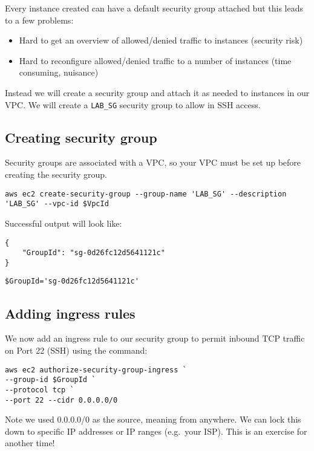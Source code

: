 Every instance created can have a default security group attached but
this leads to a few problems:

\begin{itemize}
\item
  Hard to get an overview of allowed/denied traffic to instances
  (security risk)
\item
  Hard to reconfigure allowed/denied traffic to a number of instances
  (time consuming, nuisance)
\end{itemize}

Instead we will create a security group and attach it as needed to
instances in our VPC. We will create a \texttt{LAB\_SG} security group
to allow in SSH access.

\subsection{Creating security group}\label{sec:creating-security-group}

Security groups are associated with a VPC, so your VPC must be set up
before creating the security group.

\begin{verbatim}
aws ec2 create-security-group --group-name 'LAB_SG' --description 'LAB_SG' --vpc-id $VpcId
\end{verbatim}

Successful output will look like:

\begin{verbatim}
{
    "GroupId": "sg-0d26fc12d5641121c"
}
\end{verbatim}

\begin{verbatim}
$GroupId='sg-0d26fc12d5641121c'
\end{verbatim}

\subsection{Adding ingress rules}\label{adding-ingress-rules}

We now add an ingress rule to our security group to permit inbound TCP
traffic on Port 22 (SSH) using the command:

\begin{verbatim}
aws ec2 authorize-security-group-ingress `
--group-id $GroupId `
--protocol tcp `
--port 22 --cidr 0.0.0.0/0
\end{verbatim}

Note we used 0.0.0.0/0 as the source, meaning from anywhere. We can lock
this down to specific IP addresses or IP ranges (e.g.~your ISP). This is
an exercise for another time!

